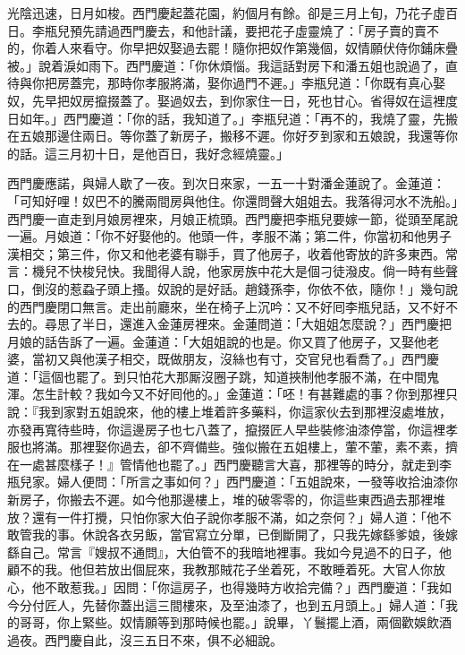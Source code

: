 光陰迅速，日月如梭。西門慶起蓋花園，約個月有餘。卻是三月上旬，乃花子虛百日。李瓶兒預先請過西門慶去，和他計議，要把花子虛靈燒了：「房子賣的賣不的，你着人來看守。你早把奴娶過去罷！隨你把奴作第幾個，奴情願伏侍你鋪床疊被。」說着淚如雨下。{}西門慶道：「你休煩惱。我這話對房下和潘五姐也說過了，直待與你把房蓋完，那時你孝服將滿，娶你過門不遲。」李瓶兒道：「你既有真心娶奴，先早把奴房攛掇蓋了。娶過奴去，到你家住一日，死也甘心。{}省得奴在這裡度日如年。」西門慶道：「你的話，我知道了。」李瓶兒道：「再不的，我燒了靈，先搬在五娘那邊住兩日。{}等你蓋了新房子，搬移不遲。你好歹到家和五娘說，我還等你的話。這三月初十日，是他百日，我好念經燒靈。」

西門慶應諾，與婦人歇了一夜。到次日來家，一五一十對潘金蓮說了。金蓮道：「可知好哩！奴巴不的騰兩間房與他住。你還問聲大姐姐去。我落得河水不洗船。」西門慶一直走到月娘房裡來，月娘正梳頭。西門慶把李瓶兒要嫁一節，從頭至尾說一遍。月娘道：「你不好娶他的。{}他頭一件，孝服不滿；第二件，你當初和他男子漢相交；第三件，你又和他老婆有聯手，買了他房子，收着他寄放的許多東西。{}常言：機兒不快梭兒快。我聞得人說，他家房族中花大是個刁徒潑皮。倘一時有些聲口，倒沒的惹蝨子頭上搔。{}奴說的是好話。趙錢孫李，你依不依，隨你！」{}幾句說的西門慶閉口無言。走出前廳來，坐在椅子上沉吟：{}又不好囘李瓶兒話，又不好不去的。尋思了半日，還進入金蓮房裡來。{}金蓮問道：「大姐姐怎麼說？」西門慶把月娘的話告訴了一遍。金蓮道：「大姐姐說的也是。{}你又買了他房子，又娶他老婆，當初又與他漢子相交，既做朋友，沒絲也有寸，交官兒也看喬了。」西門慶道：「這個也罷了。{}到只怕花大那厮沒圈子跳，知道挾制他孝服不滿，在中間鬼渾。怎生計較？我如今又不好囘他的。」金蓮道：「呸！有甚難處的事？你到那裡只說：『我到家對五姐說來，他的樓上堆着許多藥料，你這家伙去到那裡沒處堆放，亦發再寬待些時，你這邊房子也七八蓋了，攛掇匠人早些裝修油漆停當，你這裡孝服也將滿。那裡娶你過去，卻不齊備些。強似搬在五姐樓上，葷不葷，素不素，擠在一處甚麼樣子！』管情他也罷了。」西門慶聽言大喜，那裡等的時分，就走到李瓶兒家。婦人便問：「所言之事如何？」西門慶道：「五姐說來，一發等收拾油漆你新房子，你搬去不遲。如今他那邊樓上，堆的破零零的，你這些東西過去那裡堆放？還有一件打攪，只怕你家大伯子說你孝服不滿，{}如之奈何？」婦人道：「他不敢管我的事。休說各衣另飯，當官寫立分單，已倒斷開了，只我先嫁繇爹娘，後嫁繇自己。常言『嫂叔不通問』，大伯管不的我暗地裡事。我如今見過不的日子，他顧不的我。他但若放出個屁來，我教那賊花子坐着死，不敢睡着死。大官人你放心，他不敢惹我。」因問：「你這房子，也得幾時方收拾完備？」西門慶道：「我如今分付匠人，先替你蓋出這三間樓來，及至油漆了，也到五月頭上。」婦人道：「我的哥哥，你上緊些。奴情願等到那時候也罷。」說畢，丫鬟擺上酒，兩個歡娛飲酒過夜。西門慶自此，沒三五日不來，俱不必細說。


